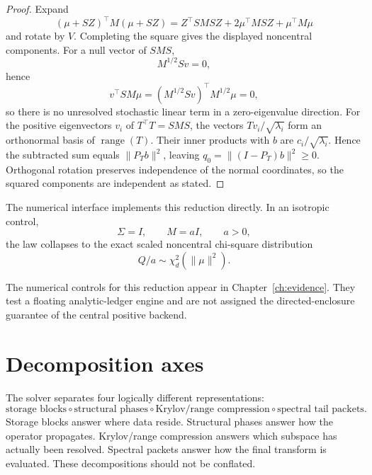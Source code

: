 \begin{proof}
Expand
\[
(\mu+SZ)^\top M(\mu+SZ)
=
Z^\top SMSZ
+
2\mu^\top MSZ
+
\mu^\top M\mu
\]
and rotate by \(V\).  Completing the square gives the displayed
noncentral components.  For a null vector of \(SMS\),
\[
M^{1/2}Sv=0,
\]
hence
\[
v^\top SM\mu
=
(M^{1/2}Sv)^\top M^{1/2}\mu
=
0,
\]
so there is no unresolved stochastic linear term in a zero-eigenvalue
direction. For the positive eigenvectors $v_i$ of $T^\top T=SMS$,
the vectors $Tv_i/\sqrt{\lambda_i}$ form an orthonormal basis of
$\operatorname{range}(T)$. Their inner products with $b$ are
$c_i/\sqrt{\lambda_i}$. Hence the subtracted sum equals $\|P_Tb\|^2$,
leaving $q_0=\|(I-P_T)b\|^2\ge0$. Orthogonal rotation preserves
independence of the normal coordinates, so the squared components are
independent as stated.
\end{proof}

The numerical interface implements this reduction directly.  In an isotropic
control,
\[
\Sigma=I,\qquad M=aI,\qquad a>0,
\]
the law collapses to the exact scaled noncentral chi-square distribution
\[
Q/a\sim\chi^2_d(\|\mu\|^2).
\]

The numerical controls for this reduction appear in
Chapter~\ref{ch:evidence}. They test a floating analytic-ledger engine and
are not assigned the directed-enclosure guarantee of the central positive
backend.

\section{Decomposition axes}

The solver separates four logically different representations:
\[
\boxed{
\text{storage blocks}
\circ
\text{structural phases}
\circ
\text{Krylov/range compression}
\circ
\text{spectral tail packets}.
}
\]
Storage blocks answer where data reside.  Structural phases answer how the
operator propagates.  Krylov/range compression answers which subspace has
actually been resolved.  Spectral packets answer how the final transform is
evaluated.  These decompositions should not be conflated.




